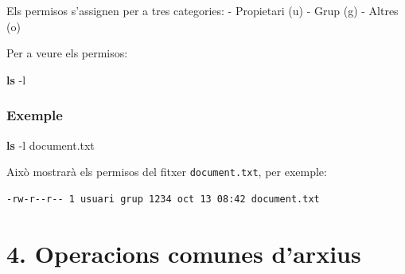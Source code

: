\documentclass[
  12 pt,
  a4paper,
]{article}
\newenvironment{Shaded}{\begin{snugshade}}{\end{snugshade}}
\newcommand{\AttributeTok}[1]{\textcolor[rgb]{0.13,0.29,0.53}{#1}}
\newcommand{\FunctionTok}[1]{\textcolor[rgb]{0.13,0.29,0.53}{\textbf{#1}}}
\newcommand{\NormalTok}[1]{#1}
\begin{document}
Els permisos s'assignen per a tres categories: - Propietari (u) - Grup
(g) - Altres (o)

Per a veure els permisos:

\begin{Shaded}
\begin{Highlighting}[]
\FunctionTok{ls} \AttributeTok{{-}l}
\end{Highlighting}
\end{Shaded}

\subsubsection{Exemple}\label{exemple-3}

\begin{Shaded}
\begin{Highlighting}[]
\FunctionTok{ls} \AttributeTok{{-}l}\NormalTok{ document.txt}
\end{Highlighting}
\end{Shaded}

Això mostrarà els permisos del fitxer \texttt{document.txt}, per
exemple:

\begin{verbatim}
-rw-r--r-- 1 usuari grup 1234 oct 13 08:42 document.txt
\end{verbatim}

\section{4. Operacions comunes
d'arxius}\label{operacions-comunes-darxius}
\end{document}
